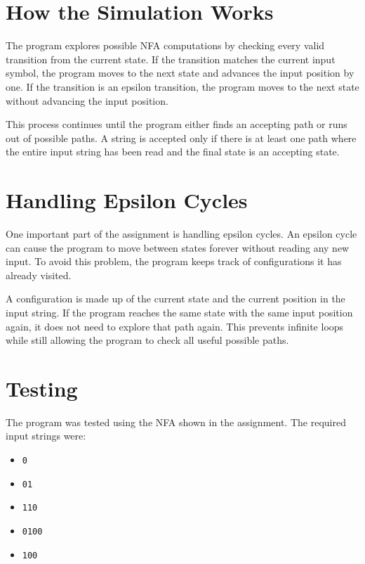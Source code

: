 \documentclass[12pt]{article}
\begin{document}
\section*{How the Simulation Works}

The program explores possible NFA computations by checking every valid transition from the current state. If the transition matches the current input symbol, the program moves to the next state and advances the input position by one. If the transition is an epsilon transition, the program moves to the next state without advancing the input position.

This process continues until the program either finds an accepting path or runs out of possible paths. A string is accepted only if there is at least one path where the entire input string has been read and the final state is an accepting state.

\section*{Handling Epsilon Cycles}

One important part of the assignment is handling epsilon cycles. An epsilon cycle can cause the program to move between states forever without reading any new input. To avoid this problem, the program keeps track of configurations it has already visited.

A configuration is made up of the current state and the current position in the input string. If the program reaches the same state with the same input position again, it does not need to explore that path again. This prevents infinite loops while still allowing the program to check all useful possible paths.

\section*{Testing}

The program was tested using the NFA shown in the assignment. The required input strings were:

\begin{itemize}
    \item \texttt{0}
    \item \texttt{01}
    \item \texttt{110}
    \item \texttt{0100}
    \item \texttt{100}
\end{itemize}
\end{document}

